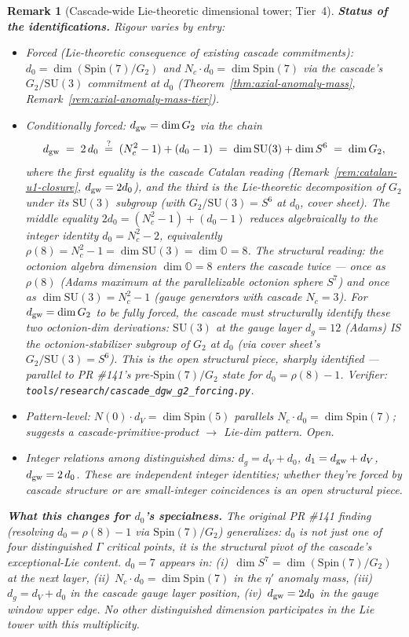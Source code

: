 \documentclass[12pt,a4paper]{article}
\newtheorem*{remark}{Remark}
\begin{document}
\begin{remark}[Cascade-wide Lie-theoretic dimensional tower; Tier~4]
\medskip\noindent\textbf{Status of the identifications.} Rigour varies by entry:
\begin{itemize}[nosep]
\item \emph{Forced} (Lie-theoretic consequence of existing cascade commitments): $d_0 = \dim(\mathrm{Spin}(7)/G_2)$ and $N_c\cdot d_0 = \dim\mathrm{Spin}(7)$ via the cascade's $G_2/\mathrm{SU}(3)$ commitment at $d_0$ (Theorem~\ref{thm:axial-anomaly-mass}, Remark~\ref{rem:axial-anomaly-mass-tier}).
\item \emph{Conditionally forced}: $d_{\rm gw} = \dim G_2$ via the chain
\[
d_{\rm gw} \;=\; 2\,d_0 \;\stackrel{?}{=}\; (N_c^2 - 1) + (d_0 - 1) \;=\; \dim\mathrm{SU}(3) + \dim S^6 \;=\; \dim G_2,
\]
where the first equality is the cascade Catalan reading (Remark~\ref{rem:catalan-u1-closure}, $d_{\rm gw} = 2 d_0$), and the third is the Lie-theoretic decomposition of $G_2$ under its $\mathrm{SU}(3)$ subgroup (with $G_2/\mathrm{SU}(3) = S^6$ at $d_0$, cover sheet). The middle equality $2 d_0 = (N_c^2 - 1) + (d_0 - 1)$ reduces algebraically to the integer identity $d_0 = N_c^2 - 2$, equivalently $\rho(8) = N_c^2 - 1 = \dim\mathrm{SU}(3) = \dim\mathbb{O} = 8$. The structural reading: the octonion algebra dimension $\dim\mathbb{O} = 8$ enters the cascade twice — once as $\rho(8)$ (Adams maximum at the parallelizable octonion sphere $S^7$) and once as $\dim\mathrm{SU}(3) = N_c^2 - 1$ (gauge generators with cascade $N_c = 3$). For $d_{\rm gw} = \dim G_2$ to be fully forced, the cascade must structurally identify these two octonion-dim derivations: $\mathrm{SU}(3)$ at the gauge layer $d_g = 12$ (Adams) IS the octonion-stabilizer subgroup of $G_2$ at $d_0$ (via cover sheet's $G_2/\mathrm{SU}(3) = S^6$). This is the open structural piece, sharply identified — parallel to PR \#141's pre-$\mathrm{Spin}(7)/G_2$ state for $d_0 = \rho(8)-1$. Verifier: \texttt{tools/research/cascade\_dgw\_g2\_forcing.py}.
\item \emph{Pattern-level}: $N(0)\cdot d_V = \dim\mathrm{Spin}(5)$ parallels $N_c\cdot d_0 = \dim\mathrm{Spin}(7)$; suggests a cascade-primitive-product $\to$ Lie-dim pattern. Open.
\item \emph{Integer relations among distinguished dims}: $d_g = d_V + d_0$, $d_1 = d_{\rm gw} + d_V$, $d_{\rm gw} = 2\,d_0$. These are independent integer identities; whether they're forced by cascade structure or are small-integer coincidences is an open structural piece.
\end{itemize}

\medskip\noindent\textbf{What this changes for $d_0$'s specialness.} The original PR \#141 finding (resolving $d_0 = \rho(8)-1$ via $\mathrm{Spin}(7)/G_2$) generalizes: $d_0$ is not just one of four distinguished $\Gamma$ critical points, it is the structural pivot of the cascade's exceptional-Lie content. $d_0 = 7$ appears in: (i)~$\dim S^7 = \dim(\mathrm{Spin}(7)/G_2)$ at the next layer, (ii)~$N_c\cdot d_0 = \dim\mathrm{Spin}(7)$ in the $\eta'$ anomaly mass, (iii)~$d_g = d_V + d_0$ in the cascade gauge layer position, (iv)~$d_{\rm gw} = 2 d_0$ in the gauge window upper edge. No other distinguished dimension participates in the Lie tower with this multiplicity.


\end{remark}
\end{document}
